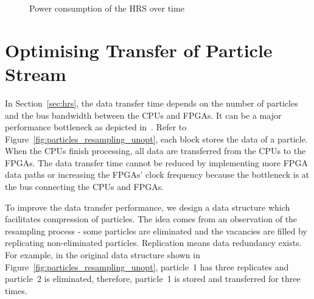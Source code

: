 \setcounter{subfigure}{0}
\begin{figure}[t!]
\centering
{}
\caption{Power consumption of the HRS over time}
\label{fig:timing}
\end{figure}

\section{Optimising Transfer of Particle Stream}
\label{sec:stream}

In Section~\ref{sec:hrs}, the data transfer time depends on the number of particles and the bus bandwidth between the CPUs and FPGAs.
It can be a major performance bottleneck as depicted in~\cite{chau13a}.
Refer to Figure~\ref{fig:particles_resampling_unopt}, each block stores the data of a particle.
When the CPUs finish processing, all data are transferred from the CPUs to the FPGAs.
The data transfer time cannot be reduced by implementing more FPGA data paths or increasing the FPGAs' clock frequency because the bottleneck is at the bus connecting the CPUs and FPGAs.

To improve the data transfer performance, we design a data structure which facilitates compression of particles.
The idea comes from an observation of the resampling process - some particles are eliminated and the vacancies are filled by replicating non-eliminated particles.
Replication means data redundancy exists.
For example, in the original data structure shown in Figure~\ref{fig:particles_resampling_unopt}, 
particle~1 has three replicates and particle~2 is eliminated, therefore, particle~1 is stored and transferred for three times.

